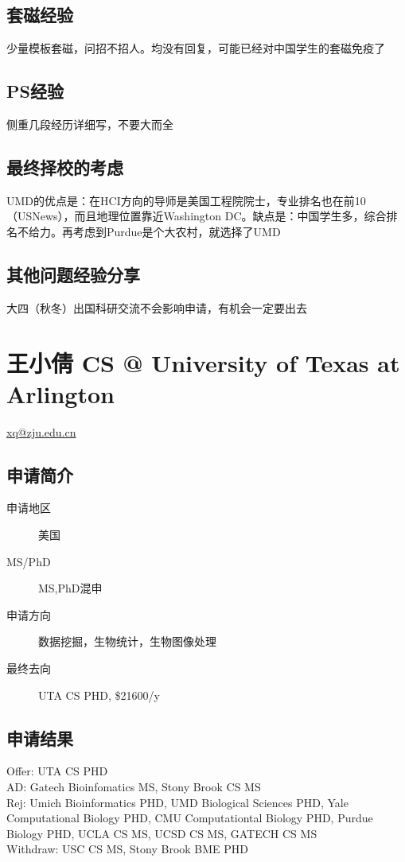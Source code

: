 \documentclass[11pt,fleqn,openany]{book} %
\begin{document}
\subsection*{套磁经验}
少量模板套磁，问招不招人。均没有回复，可能已经对中国学生的套磁免疫了
\subsection*{PS经验}
侧重几段经历详细写，不要大而全
\subsection*{最终择校的考虑}
UMD的优点是：在HCI方向的导师是美国工程院院士，专业排名也在前10（USNews），而且地理位置靠近Washington DC。缺点是：中国学生多，综合排名不给力。再考虑到Purdue是个大农村，就选择了UMD
\subsection*{其他问题经验分享}
大四（秋冬）出国科研交流不会影响申请，有机会一定要出去
\clearpage
\section{王小倩 CS @ University of Texas at Arlington}
\hfill \href{mailto:xq@zju.edu.cn}{xq@zju.edu.cn}

\noindent\begin{minipage}[t]{0.45\textwidth}
\subsection*{申请简介}
\begin{description}
\item[申请地区] 美国
\item[MS/PhD] MS,PhD混申
\item[申请方向] 数据挖掘，生物统计，生物图像处理
\item[最终去向] UTA CS PHD, \$21600/y
\end{description}
\end{minipage}
\hfill
\begin{minipage}[t]{0.45\textwidth}
\subsection*{申请结果}
\noindent Offer: UTA CS PHD\\
AD: Gatech Bioinfomatics MS, Stony Brook CS MS\\
Rej: Umich Bioinformatics PHD, UMD Biological Sciences PHD, Yale Computational Biology PHD, CMU Computationtal Biology PHD, Purdue Biology PHD, UCLA CS MS, UCSD CS MS, GATECH CS MS\\
Withdraw: USC CS MS, Stony Brook BME PHD
\end{minipage}
\end{document}
